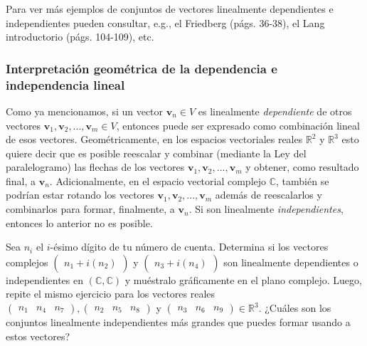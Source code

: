 \documentclass[notasLineal]{subfiles}
\begin{document}
Para ver más ejemplos de conjuntos de vectores linealmente dependientes e independientes pueden consultar, e.g., el Friedberg (págs. 36-38), el Lang introductorio (págs. 104-109), etc. 

\subsubsection*{Interpretación geométrica de la dependencia e independencia lineal}

Como ya mencionamos, si un vector $\mathbf{v}_n\in V$ es linealmente \emph{dependiente} de otros vectores $\mathbf{v}_1, \mathbf{v}_2, ..., \textbf{v}_m\in V$, entonces puede ser expresado como combinación lineal de esos vectores. Geométricamente, en los espacios vectoriales reales $\mathbb{R}^2$ y $\mathbb{R}^3$ esto quiere decir que es posible reescalar y combinar (mediante la Ley del paralelogramo) las flechas de los vectores $\mathbf{v}_1, \mathbf{v}_2, ..., \mathbf{v}_m$ y obtener, como resultado final, a $\mathbf{v}_n$. Adicionalmente, en el espacio vectorial complejo $\mathbb{C}$, también se podrían estar rotando los vectores $\mathbf{v}_1, \mathbf{v}_2, ..., \mathbf{v}_m$ \textemdash además de reescalarlos y combinarlos\textemdash \hspace{0.5mm} para formar, finalmente, a $\mathbf{v}_n$. Si son linealmente \emph{independientes}, entonces lo anterior no es posible.

\begin{Ejer}
    Sea $n_i$ el $i$-ésimo dígito de tu número de cuenta. Determina si los vectores complejos $\begin{pmatrix} n_1 + i(n_2) \end{pmatrix}$ y $\begin{pmatrix} n_3 + i(n_4) \end{pmatrix}$ son linealmente dependientes o independientes en $(\mathbb{C},\mathbb{C})$ y muéstralo gráficamente en el plano complejo. Luego, repite el mismo ejercicio para los vectores reales $\begin{pmatrix} n_1 & n_4 & n_7 \end{pmatrix}, \begin{pmatrix} n_2 & n_5 & n_8 \end{pmatrix}$ y $\begin{pmatrix} n_3 & n_6 & n_9 \end{pmatrix}\in\mathbb{R}^3.$ ¿Cuáles son los conjuntos linealmente independientes más grandes que puedes formar usando a estos vectores? 
\end{Ejer}
\end{document}

